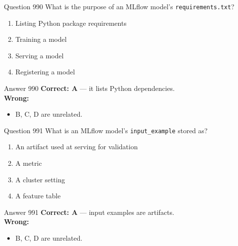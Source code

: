 \documentclass[aspectratio=169,11pt]{beamer}
\begin{document}
	\begin{frame}{Question 990}
		What is the purpose of an MLflow model's \texttt{requirements.txt}?
		\begin{enumerate}[label=\Alph*.]
			\item Listing Python package requirements
			\item Training a model
			\item Serving a model
			\item Registering a model
		\end{enumerate}
	\end{frame}
	\begin{frame}{Answer 990}
		\textbf{Correct: A} --- it lists Python dependencies.\\
		\vspace{0.5em}
		\textbf{Wrong:}
		\begin{itemize}
			\item B, C, D are unrelated.
		\end{itemize}
	\end{frame}
	
	\begin{frame}{Question 991}
		What is an MLflow model's \texttt{input\_example} stored as?
		\begin{enumerate}[label=\Alph*.]
			\item An artifact used at serving for validation
			\item A metric
			\item A cluster setting
			\item A feature table
		\end{enumerate}
	\end{frame}
	\begin{frame}{Answer 991}
		\textbf{Correct: A} --- input examples are artifacts.\\
		\vspace{0.5em}
		\textbf{Wrong:}
		\begin{itemize}
			\item B, C, D are unrelated.
		\end{itemize}
	\end{frame}
	
\end{document}
